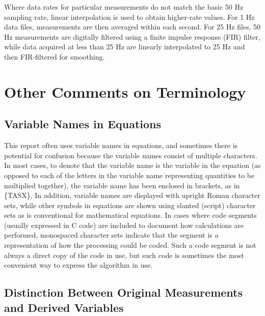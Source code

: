 \documentclass[
  english,
]{book}
\begin{document}
\protect\hypertarget{elecFilter}{}{Where data rates for particular
measurements do not match the basic 50 Hz sampling rate, linear
interpolation is used to obtain higher-rate values. For 1 Hz data files,
measurements are then averaged within each second. For 25 Hz files, 50
Hz measurements are digitally filtered using a finite impulse response
(FIR) filter, while data acquired at less than 25 Hz are linearly
interpolated to 25 Hz and then FIR-filtered for smoothing.}

\hypertarget{other-comments-on-terminology}{%
\section{Other Comments on
Terminology}\label{other-comments-on-terminology}}

\hypertarget{variable-names-in-equations}{%
\subsection{Variable Names in
Equations}\label{variable-names-in-equations}}

This report often uses variable names in equations, and sometimes there
is potential for confusion because the variable names consist of
multiple characters. In most cases, to denote that the variable name is
the variable in the equation (as opposed to each of the letters in the
variable name representing quantities to be multiplied together), the
variable name has been enclosed in brackets, as in \{TASX\}. In
addition, variable names are displayed with upright Roman character
sets, while other symbols in equations are shown using slanted (script)
character sets as is conventional for mathematical equations. In cases
where code segments (usually expressed in C code) are included to
document how calculations are performed, monospaced character sets
indicate that the segment is a representation of how the processing
could be coded. Such a code segment is not always a direct copy of the
code in use, but such code is sometimes the most convenient way to
express the algorithm in use.

\hypertarget{distinction-between-original-measurements-and-derived-variables}{%
\subsection{Distinction Between Original Measurements and Derived
Variables}\label{distinction-between-original-measurements-and-derived-variables}}
\end{document}
